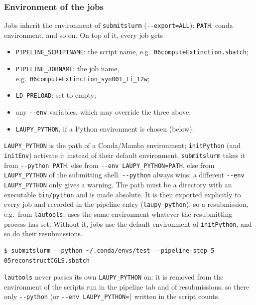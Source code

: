 \documentclass[11pt,a4paper]{article}
\newcommand{\cmd}[1]{\texttt{#1}}
\begin{document}
\subsubsection*{Environment of the jobs}

Jobs inherit the environment of \cmd{submitslurm} (\cmd{-{}-export=ALL}): \cmd{PATH}, conda
environment, and so on. On top of it, every job gets
\begin{itemize}
  \item \cmd{PIPELINE\_SCRIPTNAME}: the script name, e.g.\ \cmd{06computeExtinction.sbatch};
  \item \cmd{PIPELINE\_JOBNAME}: the job name, e.g.\ \cmd{06computeExtinction\_syn001\_ti\_12w};
  \item \cmd{LD\_PRELOAD}: set to empty;
  \item any \cmd{-{}-env} variables, which may override the three above;
  \item \cmd{LAUPY\_PYTHON}, if a Python environment is chosen (below).
\end{itemize}
\cmd{LAUPY\_PYTHON} is the path of a Conda/Mamba environment; \cmd{initPython} (and \cmd{initEnv}) activate it
instead of their default environment. \cmd{submitslurm} takes it from \cmd{-{}-python PATH}, else from
\cmd{-{}-env LAUPY\_PYTHON=PATH}, else from \cmd{LAUPY\_PYTHON} of the submitting shell. \cmd{-{}-python}
always wins: a different \cmd{-{}-env LAUPY\_PYTHON} only gives a warning. The path must be a
directory with an executable \cmd{bin/python} and is made absolute. It is then exported explicitly
to every job and recorded in the pipeline entry (\cmd{laupy\_python}), so a resubmission, e.g.\
from \cmd{lautools}, uses the same environment whatever the resubmitting process has set. Without
it, jobs use the default environment of \cmd{initPython}, and so do their resubmissions.
\begin{lstlisting}
$ submitslurm --python ~/.conda/envs/test --pipeline-step 5 05reconstructCGLS.sbatch
\end{lstlisting}
\cmd{lautools} never passes its own \cmd{LAUPY\_PYTHON} on: it is removed from the environment of the
scripts run in the pipeline tab and of resubmissions, so there only \cmd{-{}-python} (or
\cmd{-{}-env LAUPY\_PYTHON=}) written in the script counts.
\end{document}

